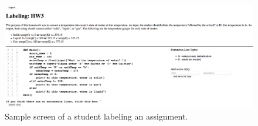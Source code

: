 \begin{figure}[ht]
  \includegraphics[width=\textwidth]{webapp}
  \caption{Sample screen of a student labeling an assignment.}
  \label{fig:webapp}
\end{figure}